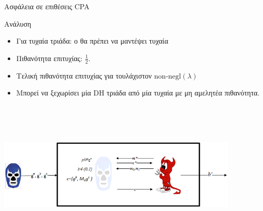 \documentclass[handout]{beamer}
\begin{document}
\begin{frame}[allowframebreaks]{Ασφάλεια σε επιθέσεις CPA}
\begin{block}{Ανάλυση}
\begin{itemize}
\item Για τυχαία τριάδα: ο \adv θα πρέπει να μαντέψει τυχαία
\item Πιθανότητα επιτυχίας: $\frac{1}{2}$.

\item Τελική πιθανότητα επιτυχίας για \advb τουλάχιστον $\text{non-negl}(\lambda)$
\item Μπορεί να ξεχωρίσει μία DH τριάδα από μία τυχαία με μη αμελητέα πιθανότητα.

\end{itemize}
\end{block}

\begin{center}
\includegraphics[height=7.15cm, width=11.5cm]{egcpa.png}
\end{center}

\end{frame}
\end{document}

